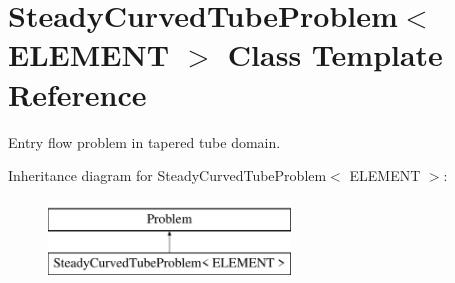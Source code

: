 \hypertarget{classSteadyCurvedTubeProblem}{}\section{Steady\+Curved\+Tube\+Problem$<$ E\+L\+E\+M\+E\+NT $>$ Class Template Reference}
\label{classSteadyCurvedTubeProblem}


Entry flow problem in tapered tube domain.  


Inheritance diagram for Steady\+Curved\+Tube\+Problem$<$ E\+L\+E\+M\+E\+NT $>$\+:\begin{figure}[H]
\begin{center}
\leavevmode
\includegraphics[height=2.000000cm]{classSteadyCurvedTubeProblem}
\end{center}
\end{figure}
